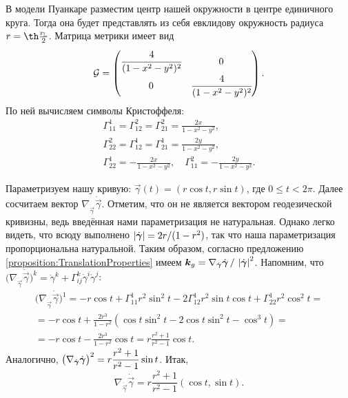 \begin{solution}
	В модели Пуанкаре разместим центр нашей окружности в центре единичного круга. Тогда она будет представлять из себя евклидову окружность радиуса $r = \th\frac{r_{\mathbb{L}}}{2}$. Матрица метрики имеет вид
	\[
		\mathcal{G} =
		\begin{pmatrix}
			\cfrac{4}{(1 - x^2 - y^2)^2} & 0\\
			0 & \cfrac{4}{(1 - x^2 - y^2)^2}\\
		\end{pmatrix}.
	\]
	По ней вычисляем символы Кристоффеля:
	\begin{gather*}
		\Gamma_{11}^1 = \Gamma_{12}^2 = \Gamma_{21}^2 = \frac{2x}{1 - x^2 - y^2},\\
		\Gamma_{22}^2 = \Gamma_{12}^1 = \Gamma_{21}^1 = \frac{2y}{1 - x^2 - y^2},\\
		\Gamma_{22}^1 = -\frac{2x}{1 - x^2 - y^2},\quad\Gamma_{11}^2 = -\frac{2y}{1 - x^2 - y^2}.
	\end{gather*}

	Параметризуем нашу кривую: $\vec{\gamma}(t) = (r\cos t, r\sin t)$, где $0 \leqslant t < 2\pi$. Далее сосчитаем вектор $\nabla_{\dot{\vec{\gamma}}}\dot{\vec{\gamma}}$. Отметим, что он не является вектором геодезической кривизны, ведь введённая нами параметризация не натуральная. Однако легко видеть, что всюду выполнено $\left\lvert\dot{\boldsymbol{\gamma}}\right\rvert = 2r / (1 - r^2)$, так что наша параметризация пропорциональна натуральной. Таким образом, согласно предложению \ref{proposition:TranslationProperties} имеем $\boldsymbol{k}_g = \nabla_{\dot{\boldsymbol{\gamma}}}\dot{\boldsymbol{\gamma}}\,/\,\left\lvert\dot{\boldsymbol{\gamma}}\right\rvert^2$. Напомним, что $\big(\nabla_{\dot{\vec{\gamma}}}\dot{\vec{\gamma}}\big)^k = \ddot{\gamma}^k + \Gamma_{ij}^k\dot{\gamma}^i\dot{\gamma}^j$:
	\begin{multline*}
		\big(\nabla_{\dot{\vec{\gamma}}}\dot{\vec{\gamma}}\big)^1 = -r\cos t + \Gamma_{11}^1r^2\sin^2t - 2\Gamma_{12}^1r^2\sin t\cos t + \Gamma_{22}^1r^2\cos^2t =\\ = -r\cos t + \frac{2r^3}{1 - r^2}(\cos t\sin^2t - 2\cos t\sin^2t - \cos^3t) =\\ = -r\cos t - \frac{2r^3}{1 - r^2}\cos t = r\frac{r^2 + 1}{r^2 - 1}\cos t.
	\end{multline*}
	Аналогично, $\displaystyle\big(\nabla_{\dot{\boldsymbol{\gamma}}}\dot{\boldsymbol{\gamma}}\big)^2 = r\frac{r^2 + 1}{r^2 - 1}\sin t$. Итак,
	\[
		\nabla_{\dot{\vec{\gamma}}}\dot{\vec{\gamma}} = r\frac{r^2 + 1}{r^2 - 1}(\cos t, \sin t).
	\]


\end{solution}
